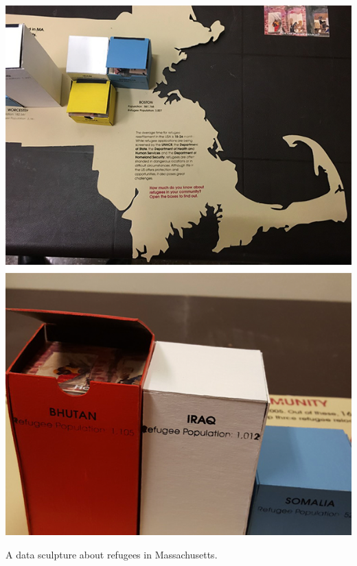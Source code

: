 \documentclass{sigchi-ext}
\begin{document}
\begin{marginfigure}[-7pc]
  \begin{minipage}{\marginparwidth}
    \centering
    \includegraphics[width=1.0\marginparwidth]{figures/mass-refugees}
    \caption{A data sculpture about refugees in Massachusetts.}~\label{fig:massrefugees}
  \end{minipage}
\end{marginfigure}
\end{document}

